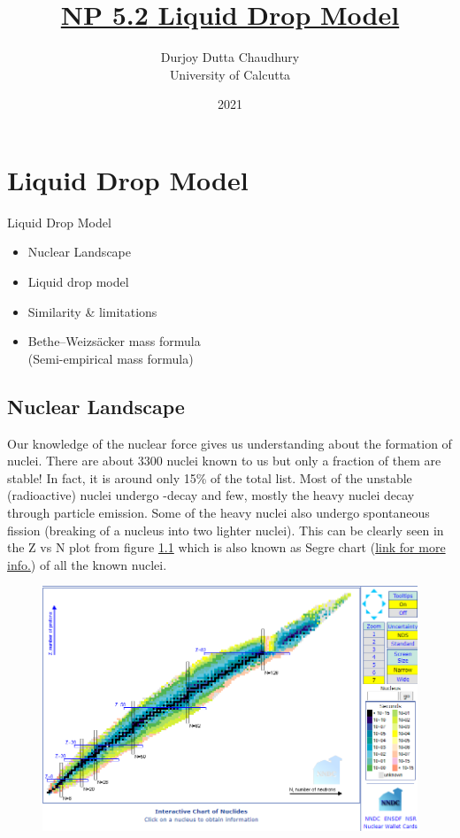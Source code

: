 \documentclass[ebook,12pt,oneside,openany]{memoir}
\title{\underline{\textbf{NP 5.2} Liquid Drop Model}}
\author{Durjoy Dutta Chaudhury\\
University of Calcutta}
\date{2021}
\begin{document}
\tableofcontents

\maketitle


 \chapter{Liquid Drop Model} 
 
 \begin{tcolorbox} [title = \textbf{Key Objectives:}, width = \textwidth]
Liquid Drop Model
\begin{itemize}
    \item Nuclear Landscape
    \item Liquid drop model
    \item Similarity \& limitations
    \item Bethe–Weizsäcker mass formula \\ (Semi-empirical mass formula) 
\end{itemize}
\end{tcolorbox}
 
\section{Nuclear Landscape}
Our knowledge of the nuclear force gives us understanding about the formation of nuclei. There are about 3300 nuclei known to us but only a fraction of them are stable! In fact, it is around only 15\% of the total list. Most of the unstable (radioactive) nuclei undergo -decay and few, mostly the heavy nuclei decay through  particle emission. Some of the heavy nuclei also undergo spontaneous fission (breaking of a nucleus into two lighter nuclei). This can be clearly seen in the Z vs N plot from figure \ref{fig:plot_ZvsN} which is also known as Segre chart (\href{https://www.nndc.bnl.gov/nudat2/}{link for more info.}) of all the known nuclei.

    \begin{figure}
        \centering
        \includegraphics[width = \textwidth]{images/ZvN_plot.png}
        \caption{}
        \label{fig:plot_ZvsN}
    \end{figure}
\end{document}
